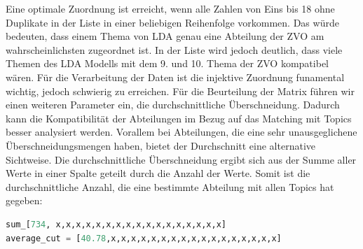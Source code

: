 \documentclass[german,version-2020-11]{uzl-thesis}
\begin{document}
\begin{enumerate}
Eine optimale Zuordnung ist erreicht, wenn alle Zahlen von Eins bis 18 ohne Duplikate in der Liste in einer beliebigen Reihenfolge vorkommen. Das würde bedeuten, dass einem Thema von LDA genau eine Abteilung der ZVO am wahrscheinlichsten zugeordnet ist. In der Liste wird jedoch deutlich, dass viele Themen des LDA Modells mit dem 9. und 10. Thema der ZVO kompatibel wären. Für die Verarbeitung der Daten ist die injektive Zuordnung funamental wichtig, jedoch schwierig zu erreichen. Für die Beurteilung der Matrix führen wir einen weiteren Parameter ein, die durchschnittliche Überschneidung. Dadurch kann die Kompatibilität der Abteilungen im Bezug auf das Matching mit Topics besser analysiert werden. Vorallem bei Abteilungen, die eine sehr unausgeglichene Überschneidungsmengen haben, bietet der Durchschnitt eine alternative Sichtweise. Die durchschnittliche Überschneidung ergibt sich aus der Summe aller Werte in einer Spalte geteilt durch die Anzahl der Werte. Somit ist die durchschnittliche Anzahl, die eine bestimmte Abteilung mit allen Topics hat gegeben: \\

\begin{lstlisting}[language=Python]
sum_[734, x,x,x,x,x,x,x,x,x,x,x,x,x,x,x,x,x]
average_cut = [40.78,x,x,x,x,x,x,x,x,x,x,x,x,x,x,x,x,x]
\end{lstlisting}\\

\end{enumerate}


\end{document}
